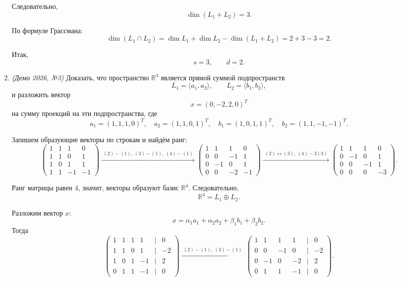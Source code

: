 \begin{enumerate}
Следовательно,
\[
\dim(L_1+L_2)=3.
\]

По формуле Грассмана:
\[
\dim(L_1\cap L_2)=\dim L_1+\dim L_2-\dim(L_1+L_2)=2+3-3=2.
\]

Итак,
\[
s=3,\qquad d=2.
\]

\item \textit{(Демо 2026, №3)} Доказать, что пространство $\mathbb{R}^4$ является прямой суммой подпространств
\[
L_1=\langle a_1,a_2\rangle,\qquad L_2=\langle b_1,b_2\rangle,
\]
и разложить вектор
\[
x=(0,-2,2,0)^T
\]
на сумму проекций на эти подпространства, где
\[
a_1=(1,1,1,0)^T,\quad a_2=(1,1,0,1)^T,\quad
b_1=(1,0,1,1)^T,\quad b_2=(1,1,-1,-1)^T.
\]

Запишем образующие векторы по строкам и найдём ранг:
\[
    \begin{pmatrix}
        1 & 1 & 1 & 0 \\
        1 & 1 & 0 & 1 \\
        1 & 0 & 1 & 1 \\
        1 & 1 & -1 & -1
    \end{pmatrix}
    \xrightarrow{\,\, (2)-(1),\ (3)-(1),\ (4)-(1) \,\,}
    \begin{pmatrix}
        1 & 1 & 1 & 0 \\
        0 & 0 & -1 & 1 \\
        0 & -1 & 0 & 1 \\
        0 & 0 & -2 & -1
    \end{pmatrix}
    \xrightarrow{\,\, (2)\leftrightarrow(3),\ (4)-2(3) \,\,}
    \begin{pmatrix}
        1 & 1 & 1 & 0 \\
        0 & -1 & 0 & 1 \\
        0 & 0 & -1 & 1 \\
        0 & 0 & 0 & -3
    \end{pmatrix}.
\]

Ранг матрицы равен 4, значит, векторы образуют базис $\mathbb{R}^4$.
Следовательно,
\[
\mathbb{R}^4=L_1\oplus L_2.
\]

Разложим вектор $x$:
\[
x=\alpha_1 a_1+\alpha_2 a_2+\beta_1 b_1+\beta_2 b_2.
\]
Тогда
\[
    \begin{pmatrix}
        1 & 1 & 1 & 1 & | & 0 \\
        1 & 1 & 0 & 1 & | & -2 \\
        1 & 0 & 1 & -1 & | & 2 \\
        0 & 1 & 1 & -1 & | & 0
    \end{pmatrix}
    \xrightarrow{\,\, (2)-(1),\ (3)-(1) \,\,}
    \begin{pmatrix}
        1 & 1 & 1 & 1 & | & 0 \\
        0 & 0 & -1 & 0 & | & -2 \\
        0 & -1 & 0 & -2 & | & 2 \\
        0 & 1 & 1 & -1 & | & 0
    \end{pmatrix}.
\]


\end{enumerate}
